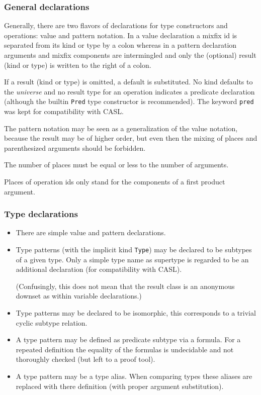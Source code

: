 \documentclass{article}
\begin{document}
\subsubsection*{General declarations}

Generally, there are two flavors of declarations for type constructors and
operations: value and pattern notation. In a value declaration a mixfix id is
separated from its kind or type by a colon whereas in a pattern declaration
arguments and mixfix components are intermingled and only the (optional)
result (kind or type) is written to the right of a colon. 

If a result (kind or type) is omitted, a default is substituted. No kind
defaults to the \emph{universe} and no result type for an operation indicates
a predicate declaration (although the builtin \texttt{Pred} type constructor
is recommended). The keyword \texttt{pred} was kept for compatibility with
CASL.

The pattern notation may be seen as a generalization of the value notation,
because the result may be of higher order, but even then the mixing of places
and parenthesized arguments should be forbidden.

The number of places must be equal or less to the number of arguments.

Places of operation ids only stand for the components of a first product
argument.

\subsubsection*{Type declarations}

\begin{itemize}
\item There are simple value and pattern declarations. 
\item Type patterns (with the implicit kind \texttt{Type})
  may be declared to be subtypes of a given type. Only a simple type name as
  supertype is regarded to be an additional declaration (for compatibility
  with CASL).
  
  (Confusingly, this does not mean that the result class is an anonymous
  downset as within variable declarations.)
\item Type patterns may be declared to be isomorphic, this corresponds to a
  trivial cyclic subtype relation.
\item A type pattern may be defined as predicate subtype via a
  formula. For a repeated definition the equality of the formulas is
  undecidable and not thoroughly checked (but left to a proof tool).  
\item A type pattern may be a type alias. When comparing types these aliases
  are replaced with there definition (with proper argument substitution). 
\end{itemize}
\end{document}
